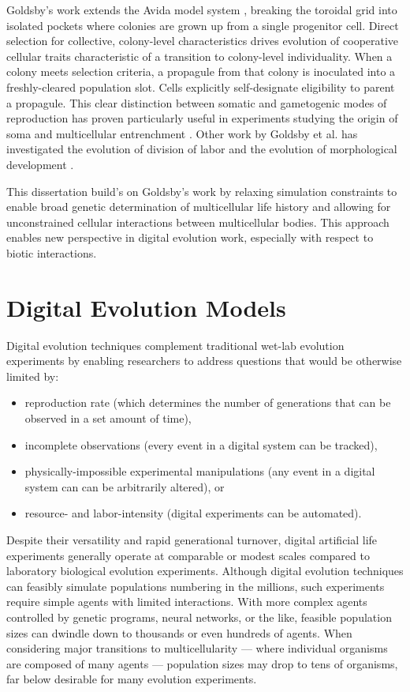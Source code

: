 Goldsby’s work extends the Avida model system \citep{ofria2009artificial}, breaking the toroidal grid into isolated pockets where colonies are grown up from a single progenitor cell.
Direct selection for collective, colony-level characteristics drives evolution of cooperative cellular traits characteristic of a transition to colony-level individuality.
When a colony meets selection criteria, a propagule from that colony is inoculated into a freshly-cleared population slot.
Cells explicitly self-designate eligibility to parent a propagule.
This clear distinction between somatic and gametogenic modes of reproduction has proven particularly useful in experiments studying the origin of soma \citep{goldsby2014evolutionary} and multicellular entrenchment \citep{goldsby2020major}.
Other work by Goldsby et al. has investigated the evolution of division of labor \citep{goldsby2010evolution, goldsby2012task} and the evolution of morphological development \citep{goldsby2017increasing}.

This dissertation build's on Goldsby's work by relaxing simulation constraints to enable broad genetic determination of multicellular life history and allowing for unconstrained cellular interactions between multicellular bodies.
This approach enables new perspective in digital evolution work, especially with respect to biotic interactions.

\section{Digital Evolution Models}

Digital evolution techniques complement traditional wet-lab evolution experiments by enabling researchers to address questions that would be otherwise limited by:
\begin{itemize}
\item reproduction rate (which determines the number of generations that can be observed in a set amount of time),
\item incomplete observations (every event in a digital system can be tracked),
\item physically-impossible experimental manipulations (any event in a digital system can can be arbitrarily altered), or
\item resource- and labor-intensity (digital experiments can be automated).
\end{itemize}

Despite their versatility and rapid generational turnover, digital artificial life experiments generally operate at comparable or modest scales compared to laboratory biological evolution experiments.
Although digital evolution techniques can feasibly simulate populations numbering in the millions, such experiments require simple agents with limited interactions.
With more complex agents controlled by genetic programs, neural networks, or the like, feasible population sizes can dwindle down to thousands or even hundreds of agents.
When considering major transitions to multicellularity --- where individual organisms are composed of many agents --- population sizes may drop to tens of organisms, far below desirable for many evolution experiments.

